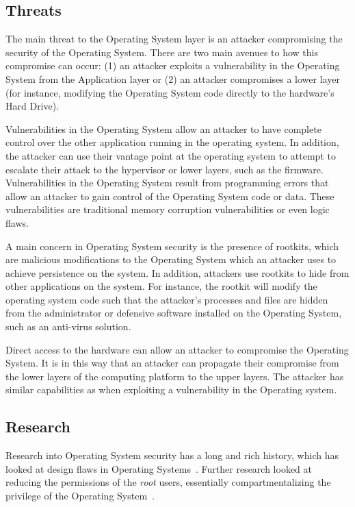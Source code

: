\documentclass[11pt,letterpaper]{article}
\begin{document}
\subsection{Threats}

The main threat to the Operating System layer is an attacker
compromising the security of the Operating System. There are two main
avenues to how this compromise can occur: (1) an attacker exploits a
vulnerability in the Operating System from the Application layer or
(2) an attacker compromises a lower layer (for instance, modifying the
Operating System code directly to the hardware's Hard Drive).

Vulnerabilities in the Operating System allow an attacker to have
complete control over the other application running in the operating
system. In addition, the attacker can use their vantage point at the
operating system to attempt to escalate their attack to the hypervisor
or lower layers, such as the firmware. Vulnerabilities in the
Operating System result from programming errors that allow an attacker
to gain control of the Operating System code or data. These
vulnerabilities are traditional memory corruption vulnerabilities or
even logic flaws. 

A main concern in Operating System security is the presence of
rootkits, which are malicious modifications to the Operating System
which an attacker uses to achieve persistence on the system. In
addition, attackers use rootkits to hide from other applications on
the system. For instance, the rootkit will modify the operating system
code such that the attacker's processes and files are hidden from the
administrator or defensive software installed on the Operating System,
such as an anti-virus solution. 

Direct access to the hardware can allow an attacker to compromise the
Operating System. It is in this way that an attacker can propagate
their compromise from the lower layers of the computing platform to
the upper layers. The attacker has similar capabilities as when
exploiting a vulnerability in the Operating system.

\subsection{Research}

Research into Operating System security has a long and rich history,
which has looked at design flaws in Operating
Systems~\cite{Attanasio1973}. Further research looked at reducing the
permissions of the \emph{root} users, essentially compartmentalizing
the privilege of the Operating System~\cite{Kamp2000, Kurmus2014a}.
\end{document}

